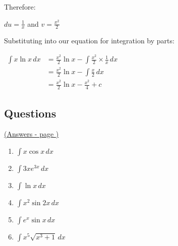 \documentclass[../main.tex]{subfiles}
\begin{document}
Therefore:

\(du=\frac{1}{x}\) and \(v=\frac{x^2}{2}\)

Substituting into our equation for integration by parts:

$
\!
\begin{aligned}
    \int x\ln{x}\, dx
    &= \frac{x^2}{2}\ln{x}-\int \frac{x^2}{2}\times \frac{1}{x}\, dx\\
    &=\frac{x^2}{2}\ln{x}-\int \frac{x}{2}\, dx\\
    &=\frac{x^2}{2}\ln{x}-\frac{x^2}{4}+c
\end{aligned}
$

\pagebreak
\hypertarget{integrationbypartslink}{\subsection*{Questions}}
\hyperlink{integrationbypartsanswers}{(Answers - page {\pageref*{Integration by parts answers}})}

\label{Integration by parts}

\begin{enumerate}
    \item \(\int x\cos{x} \, dx\)

    \item \(\int 3xe^{3x}\, dx\)

    \item \(\int \ln{x}\, dx\)

    \item \(\int x^2 \sin{2x} \, dx\)

    \item \(\int e^x \sin{x}\, dx\)

    \item \(\int x^5 \sqrt{x^3+1}\, dx\)
    
    
\end{enumerate}


\pagebreak
\end{document}

